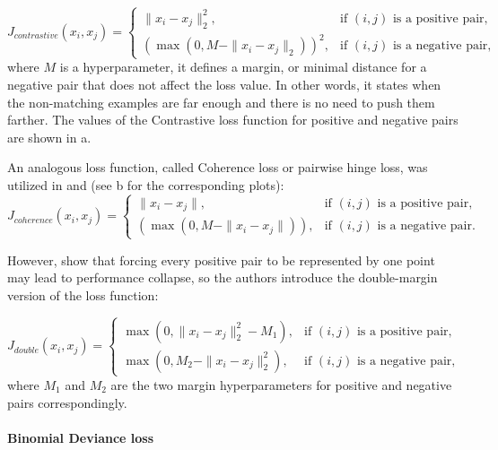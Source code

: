 \begin{equation}
\label{eq:contrastive}
J_{contrastive}(x_i, x_j) = \begin{cases} \| x_i - x_j \|^{2}_{2}, & \text{if $(i,j)$ is a positive pair,} &\\  (\max(0, M - \| x_i - x_j \|_{2}))^2, & \text{if $(i,j)$ is a negative pair,}\end{cases}
\end{equation}
where $M$ is a hyperparameter, it defines a margin, or minimal distance for a negative pair that does not affect the loss value. In other words, it states when the non-matching examples are far enough and there is no need to push them farther.
The values of the Contrastive loss function for positive and negative pairs are shown in a.

An analogous loss function, called Coherence loss or pairwise hinge loss, was utilized in \citep{mobahi2009deep} and \citep{Simo15} (see b for the corresponding plots):
\begin{equation}
\label{eq:coherence}
J_{coherence}(x_i, x_j) = \begin{cases} \| x_i - x_j \|, & \text{if $(i,j)$ is a positive pair,} &\\  (\max(0, M - \| x_i - x_j \|)), & \text{if $(i,j)$ is a negative pair.}\end{cases}
\end{equation}

However, \citep{Lin15} show that forcing every positive pair to be represented by one point may lead to performance collapse, so the authors introduce the double-margin version of the loss function: 

\begin{equation}
\label{eq:double}
J_{double}(x_i, x_j) = \begin{cases} \max(0,\| x_i - x_j \|^{2}_{2} -M_1), & \text{if $(i,j)$ is a positive pair,} &\\  \max(0, M_2 - \| x_i - x_j \|_{2}^2), & \text{if $(i,j)$ is a negative pair,}\end{cases}
\end{equation}
where $M_1$ and $M_2$ are the two margin hyperparameters for positive and negative pairs correspondingly.\\\\


\bigskip\indent\textbf{Binomial Deviance loss}
 
